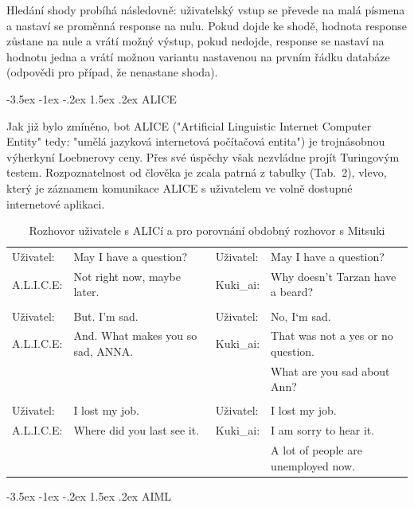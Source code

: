 \documentclass[a4paper,10pt]{article}
\makeatletter
\theoremstyle{definition}
\renewcommand\section{\@startsection {section}{1}{\z@}%
                                   {-3.5ex \@plus -1ex \@minus -.2ex}%
                                   {1.5ex \@plus.2ex}%
                                   {\large\bfseries}}
\renewcommand\subsection{\@startsection {subsection}{1}{\z@}%
                                   {-3.5ex \@plus -1ex \@minus -.2ex}%
                                   {1.5ex \@plus.2ex}%
                                   {\normalsize\bfseries}}
\makeatother
\begin{document}
Hledání shody probíhá následovně: uživatelský vstup se převede na malá písmena a nastaví se proměnná response na nulu. Pokud dojde ke shodě, hodnota response zůstane na nule a vrátí možný výstup, pokud nedojde, response se nastaví na hodnotu jedna a vrátí možnou variantu nastavenou na prvním řádku databáze (odpovědi pro případ, že nenastane shoda). \cite{7}\cite{4}

\section{ALICE}
\label{sec:4}

Jak již bylo zmíněno, bot ALICE ("Artificial Linguistic Internet Computer Entity" tedy: "umělá jazyková internetová počítačová entita") je trojnásobnou výherkyní Loebnerovy ceny. Přes své úspěchy však nezvládne projít Turingovým testem. Rozpoznatelnost od člověka je zcala patrná z tabulky (Tab.~2), vlevo, který je záznamem komunikace ALICE s uživatelem ve volně dostupné internetové aplikaci.\cite{3}\cite{a}

\begin{table}[h] 
\begin{center}

\label{tab:1}
\begin{tabular}{llll}
\hline\noalign{\smallskip}
Uživatel: & May I have a question? & Uživatel: & May I have a question? \\
A.L.I.C.E:& Not right now, maybe later.      & Kuki\_ai: & Why doesn't Tarzan have a beard? \\
&&&\\
Uživatel: & But. I’m sad. & Uživatel: & No, I‘m sad.\\
A.L.I.C.E:& And. What makes you so sad, ANNA.      & Kuki\_ai: & That was not a yes or no question. \\
&&&What are you sad about Ann?\\
&&&\\
Uživatel: & I lost my job. & Uživatel: &I lost my job. \\
A.L.I.C.E:&Where did you last see it.     & Kuki\_ai: & I am sorry to hear it.\\
&&& A lot of people are unemployed now. \\
\hline
\end{tabular}
\caption{Rozhovor uživatele s ALICí a pro porovnání obdobný rozhovor s Mitsuki } 
\end{center}
\end{table}

\subsection{AIML}
\label{subsec:1}
\end{document}
